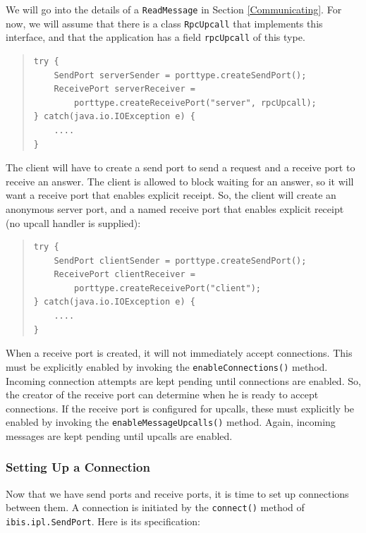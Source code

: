 \documentclass[10pt]{article}
\begin{document}
We will go into the details of a \texttt{ReadMessage} in Section
\ref{Communicating}. For now, we will assume that there is a
class \texttt{RpcUpcall} that implements this interface, and
that the application has a field \texttt{rpcUpcall} of this type.

{\small
\begin{quote}
\begin{verbatim}
try {
    SendPort serverSender = porttype.createSendPort();
    ReceivePort serverReceiver =
        porttype.createReceivePort("server", rpcUpcall);
} catch(java.io.IOException e) {
    ....
}
\end{verbatim}
\end{quote}
}

\noindent
The client will have to create a send port
to send a request and a receive port to receive an answer.
The client is allowed to block waiting for an answer, so it will
want a receive port that enables explicit receipt.
So, the client will create an anonymous server port, and a named
receive port that enables explicit receipt (no upcall handler is supplied):
{\small
\begin{quote}
\begin{verbatim}
try {
    SendPort clientSender = porttype.createSendPort();
    ReceivePort clientReceiver =
        porttype.createReceivePort("client");
} catch(java.io.IOException e) {
    ....
}
\end{verbatim}
\end{quote}
}

\noindent
When a receive port is created, it will not immediately accept connections.
This must be explicitly enabled by
invoking the \texttt{enableConnections()} method.
Incoming connection attempts are kept pending until connections are enabled.
So, the creator of
the receive port can determine when he is ready to accept connections.
If the receive port is configured for upcalls, these must
explicitly be enabled by invoking the \texttt{enableMessageUpcalls()} method.
Again, incoming messages are kept pending until upcalls are enabled.

\subsubsection{Setting Up a Connection}

Now that we have send ports and receive ports, it is time to set up
connections between them.
A connection is initiated by the \texttt{connect()} method of
\texttt{ibis.ipl.SendPort}.
Here is its specification:
\end{document}
